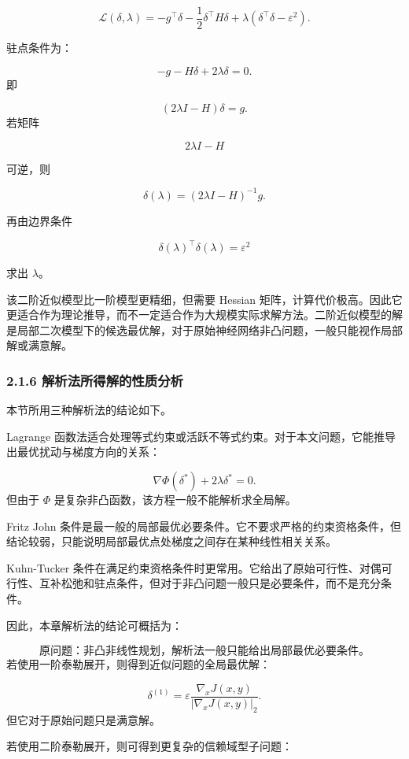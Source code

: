 ﻿\documentclass[UTF8,zihao=-4,fontset=none]{ctexart}
\begin{document}
\[
\mathcal{L}(\delta,\lambda)
=
-g^\top\delta-\frac12\delta^\top H\delta
+
\lambda(\delta^\top\delta-\varepsilon^2).
\]

驻点条件为：

\[
-g-H\delta+2\lambda\delta=0.
\]
\noindent 即

\[
(2\lambda I-H)\delta=g.
\]
\noindent 若矩阵

\[
2\lambda I-H
\]

可逆，则

\[
\delta(\lambda)
=
(2\lambda I-H)^{-1}g.
\]

再由边界条件

\[
\delta(\lambda)^\top\delta(\lambda)=\varepsilon^2
\]

求出 \(\lambda\)。

该二阶近似模型比一阶模型更精细，但需要 Hessian 矩阵，计算代价极高。因此它更适合作为理论推导，而不一定适合作为大规模实际求解方法。二阶近似模型的解是局部二次模型下的候选最优解，对于原始神经网络非凸问题，一般只能视作局部解或满意解。

\subsubsection*{2.1.6 解析法所得解的性质分析}
{}

本节所用三种解析法的结论如下。

Lagrange 函数法适合处理等式约束或活跃不等式约束。对于本文问题，它能推导出最优扰动与梯度方向的关系：

\[
\nabla\Phi(\delta^*)+2\lambda\delta^*=0.
\]
\noindent 但由于 \(\Phi\) 是复杂非凸函数，该方程一般不能解析求全局解。

Fritz John 条件是最一般的局部最优必要条件。它不要求严格的约束资格条件，但结论较弱，只能说明局部最优点处梯度之间存在某种线性相关关系。

Kuhn-Tucker 条件在满足约束资格条件时更常用。它给出了原始可行性、对偶可行性、互补松弛和驻点条件，但对于非凸问题一般只是必要条件，而不是充分条件。

因此，本章解析法的结论可概括为：

\[
\text{原问题：非凸非线性规划，解析法一般只能给出局部最优必要条件。}
\]
\noindent 若使用一阶泰勒展开，则得到近似问题的全局最优解：

\[
\delta^{(1)}
=
\varepsilon
\frac{\nabla_xJ(x,y)}{|\nabla_xJ(x,y)|_2}.
\]
\noindent 但它对于原始问题只是满意解。

若使用二阶泰勒展开，则可得到更复杂的信赖域型子问题：
\end{document}
